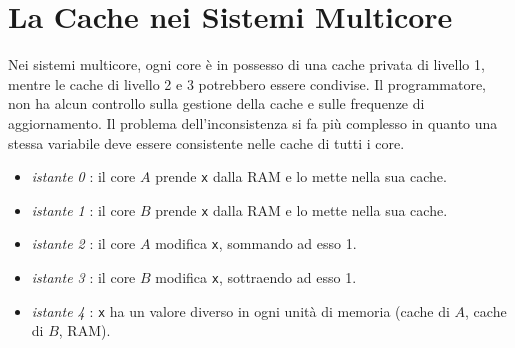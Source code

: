 \documentclass[10pt, letterpaper]{report}
\begin{document}
\section{La Cache nei Sistemi Multicore}
Nei sistemi multicore, ogni core è in possesso di una cache privata di livello 1, mentre le cache di livello 2 e 3 potrebbero essere condivise. Il programmatore, non ha alcun controllo sulla gestione della cache e sulle frequenze di aggiornamento. Il problema dell'inconsistenza si fa più complesso in quanto una stessa variabile deve essere consistente nelle cache di tutti i core.\begin{itemize}
    \item \textit{istante 0} : il core $A$ prende \texttt{x} dalla RAM e lo mette nella sua cache. 
    \item \textit{istante 1} : il core $B$ prende \texttt{x} dalla RAM e lo mette nella sua cache. 
    \item \textit{istante 2} : il core $A$ modifica \texttt{x}, sommando ad esso 1.
    \item \textit{istante 3} : il core $B$ modifica \texttt{x}, sottraendo ad esso 1. 
    \item \textit{istante 4} : \texttt{x} ha un valore diverso in ogni unità di memoria (cache di $A$, cache di $B$, RAM).
\end{itemize}
\end{document}
